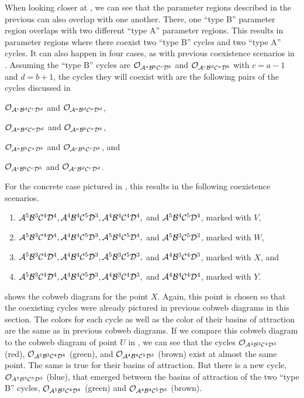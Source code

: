 When looking closer at , we can see that the parameter regions described in the previous  can also overlap with one another.
There, one ``type B'' parameter region overlaps with two different ``type A'' parameter regions.
This results in parameter regions where there coexist two ``type B'' cycles and two ``type A'' cycles.
It can also happen in four cases, as with previous coexistence scenarios in .
Assuming the ``type B'' cycles are $\Cycle{\A^a\B^b\C^c\D^b}$ and $\Cycle{\A^c\B^d\C^a\D^b}$ with $c = a - 1$ and $d = b + 1$, the cycles they will coexist with are the following pairs of the cycles discussed in 
\begin{enumerate*}
	\item $\Cycle{\A^c\B^d\C^c\D^d}$ and $\Cycle{\A^a\B^d\C^a\D^d}$,
	\item $\Cycle{\A^a\B^d\C^a\D^d}$ and $\Cycle{\A^a\B^b\C^a\D^b}$,
	\item $\Cycle{\A^a\B^b\C^a\D^b}$ and $\Cycle{\A^c\B^b\C^c\D^b}$, and
	\item $\Cycle{\A^c\B^b\C^c\D^b}$ and $\Cycle{\A^c\B^d\C^c\D^d}$.
\end{enumerate*}
For the concrete case pictured in , this results in the following coexistence scenarios.
\begin{enumerate}
	\item $\A^5\B^3\C^4\D^4, \A^4\B^4\C^5\D^3, \A^4\B^4\C^4\D^4,$ and $\A^5\B^4\C^5\D^4$, marked with $V$,
	\item $\A^5\B^3\C^4\D^4, \A^4\B^4\C^5\D^3, \A^5\B^4\C^5\D^4,$ and $\A^5\B^3\C^5\D^3$, marked with $W$,
	\item $\A^5\B^3\C^4\D^4, \A^4\B^4\C^5\D^3, \A^5\B^3\C^5\D^3,$ and $\A^4\B^3\C^4\D^3$, marked with $X$, and
	\item $\A^5\B^3\C^4\D^4, \A^4\B^4\C^5\D^3, \A^4\B^3\C^4\D^3,$ and $\A^4\B^4\C^4\D^4$, marked with $Y$.
\end{enumerate}

 shows the cobweb diagram for the point $X$.
Again, this point is chosen so that the coexisting cycles were already pictured in previous cobweb diagrams in this section.
The colors for each cycle as well as the color of their basins of attraction are the same as in previous cobweb diagrams.
If we compare this cobweb diagram to the cobweb diagram of point $U$ in , we can see that the cycles $\Cycle{\A^4\B^3\C^4\D^3}$ (red), $\Cycle{\A^5\B^3\C^4\D^4}$ (green), and $\Cycle{\A^4\B^4\C^5\D^3}$ (brown) exist at almost the same point.
The same is true for their basins of attraction.
But there is a new cycle, $\Cycle{A^5\B^3\C^5\D^3}$ (blue), that emerged between the basins of attraction of the two ``type B'' cycles, $\Cycle{\A^5\B^3\C^4\D^4}$ (green) and $\Cycle{\A^4\B^4\C^5\D^3}$ (brown).

